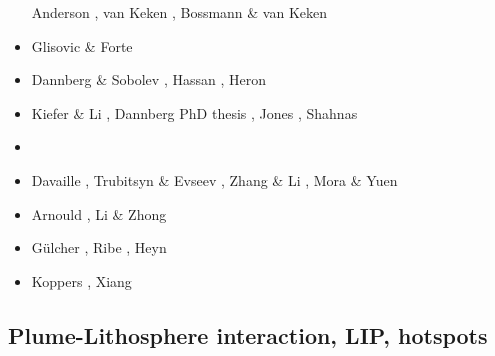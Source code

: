 \begin{scriptsize}
\begin{itemize}
                            Anderson \cite{ande13}, van Keken \etal \cite{vadv13}, 
                            Bossmann \& van Keken \cite{bova13}
\item[\twothousandfourteen] Glisovic \& Forte \cite{glfo14} 
\item[\twothousandfifteen] Dannberg \& Sobolev \cite{daso15}, Hassan \etal \cite{hafg15}, 
                           Heron \etal \cite{hels15}
\item[\twothousandsixteen] Kiefer \& Li \cite{kili16}, Dannberg PhD thesis \cite{dannbergphd}, 
                           Jones \etal \cite{jodc16}, Shahnas \etal \cite{shpy16}
\item[\twothousandseventeen] \cite{moyu17}\cite{lizh17}
\item[\twothousandeighteen] Davaille \etal \cite{dacc18}, Trubitsyn \& Evseev \cite{trev18}, 
                            Zhang \& Li \cite{zhli18}, Mora \& Yuen \cite{moyu18}
\item[\twothousandnineteen] Arnould \etal \cite{argc19}, Li \& Zhong \cite{lizh19}
\item[\twothousandtwenty] G{\"u}lcher \etal \cite{gugm20}, Ribe \etal \cite{rits20},
                          Heyn \etal \cite{hect20b}
\item[\twothousandtwentyone] Koppers \etal \cite{kobj21}, Xiang \etal \cite{xiwk21}
\end{itemize}
\end{scriptsize}

\subsection{Plume-Lithosphere interaction, LIP, hotspots}

